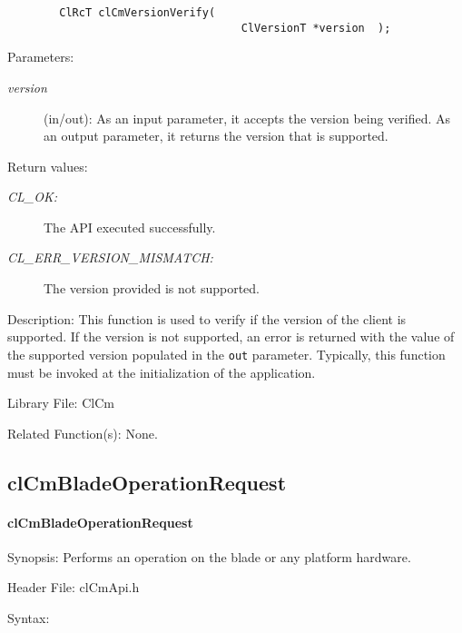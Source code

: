 \begin{flushleft}
\begin{Desc}
\footnotesize\begin{verbatim}        ClRcT clCmVersionVerify(
                         			ClVersionT *version  );
\end{verbatim}
\normalsize
\end{Desc}
\begin{Desc}
\item[Parameters:]
\begin{description}
\item[{\em version}](in/out): As an input parameter, it accepts the version being verified. As an output parameter, it returns the version that is 
supported.
\end{description}
\end{Desc}
\begin{Desc}
\item[Return values:]
\begin{description}
\item[{\em CL\_\-OK:}]The API executed successfully. \item[{\em CL\_\-ERR\_\-VERSION\_\-MISMATCH:}]The version provided is not supported.\end{description}
\end{Desc}
\begin{Desc}
\item[Description:]This function is used to verify if the version of the client is supported. If the version is not supported, an error is returned 
with the value of the supported version populated in the {\tt{out}} parameter. Typically, this function must be invoked at the initialization of the application.
\end{Desc}
\begin{Desc}
\item[Library File:]Cl\-Cm\end{Desc}
\begin{Desc}
\item[Related Function(s):]None. \end{Desc}


\newpage
\subsection{clCmBladeOperationRequest}
\hypertarget{pagecm202}{}\paragraph{cl\-Cm\-Blade\-Operation\-Request}\label{pagecm202}
\begin{Desc}
\item[Synopsis:]Performs an operation on the blade or any platform hardware.\end{Desc}
\begin{Desc}
\item[Header File:]clCmApi.h\end{Desc}
\begin{Desc}
\item[Syntax:]


\end{Desc}
\end{flushleft}
